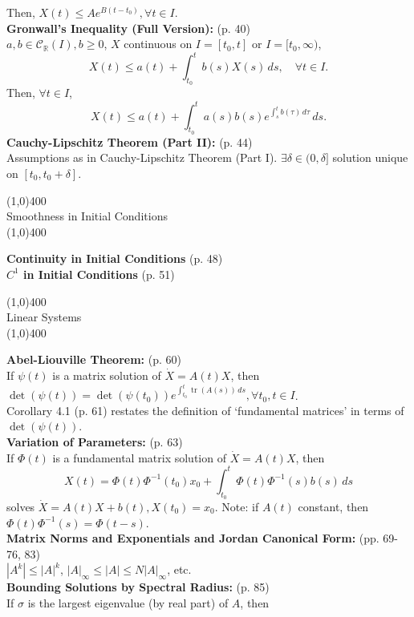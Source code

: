 \documentclass[11pt]{article}
\newcommand{\inv}{^{-1}}                            %
\newcommand{\R}{\mathbb{R}}                         %
\newcommand{\C}{\mathcal{C}}
\newcommand{\tr}{\operatorname{tr}}                 %
\begin{document}
Then, $X(t) \leq Ae^{B(t - t_0)}, \forall t \in I$.\\
{\bf Gronwall's Inequality (Full Version):} (p. 40)\\
$a,b \in \C_{\R}(I), b \geq 0$, $X$ continuous on $I = [t_0,t]$ or
$I = [t_0,\infty)$,
\[X(t) \leq a(t) + \int_{t_0}^t b(s)X(s) \, ds, \quad \forall t \in I.\]
Then, $\forall t \in I$,
\[X(t) \leq a(t) + \int_{t_0}^t a(s)b(s)e^{\int_s^t b(\tau) \, d\tau} \, ds.\]
{\bf Cauchy-Lipschitz Theorem (Part II):} (p. 44)\\
Assumptions as in Cauchy-Lipschitz Theorem (Part I).
$\exists \delta \in (0,\delta]$ solution unique on $[t_0,t_0 + \delta]$.
\newpage
\begin{center}
\line(1,0){400}\\
{\large Smoothness in Initial Conditions}\\
\vspace{-0.1in}
\line(1,0){400}
\end{center}
{\bf Continuity in Initial Conditions} (p. 48)\\
{\bf $C^1$ in Initial Conditions} (p. 51)
\begin{center}
\line(1,0){400}\\
{\large Linear Systems}\\
\vspace{-0.1in}
\line(1,0){400}
\end{center}
{\bf Abel-Liouville Theorem:} (p. 60)\\
If $\psi(t)$ is a matrix solution of $\dot X = A(t)X$, then
$\det(\psi(t)) = \det(\psi(t_0))e^{\int_{t_0}^t \tr(A(s)) \, ds},
\forall t_0,t \in I$.\\
Corollary 4.1 (p. 61) restates the definition of `fundamental matrices' in
terms of $\det(\psi(t))$.\\
{\bf Variation of Parameters:} (p. 63)\\
If $\Phi(t)$ is a fundamental matrix solution of $\dot X = A(t)X$, then
\[X(t) = \Phi(t)\Phi\inv(t_0)x_0 + \int_{t_0}^t \Phi(t)\Phi\inv(s)b(s) \, ds\]
solves $\dot X = A(t)X + b(t), X(t_0) = x_0$. Note: if $A(t)$ constant, then
$\Phi(t)\Phi\inv(s) = \Phi(t - s)$.\\
{\bf Matrix Norms and Exponentials and Jordan Canonical Form:} (pp. 69-76, 83)\\
$|A^k| \leq |A|^k$, $|A|_\infty \leq |A| \leq N|A|_\infty$, etc.\\
{\bf Bounding Solutions by Spectral Radius:} (p. 85)\\
If $\sigma$ is the largest eigenvalue (by real part) of $A$, then
\end{document}
